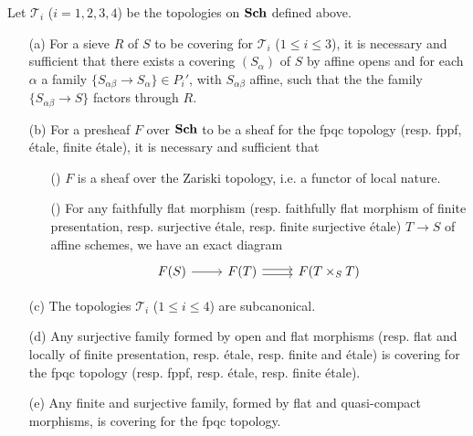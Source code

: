 \begin{proposition}\label{scheme topology on Sch by refining family prop}
Let $\mathcal{T}_i$ ($i=1,2,3,4$) be the topologies on $\mathbf{Sch}$ defined above.
\begin{enumerate}
    \item[(a)] For a sieve $R$ of $S$ to be covering for $\mathcal{T}_i$ ($1\leq i\leq 3$), it is necessary and sufficient that there exists a covering $(S_\alpha)$ of $S$ by affine opens and for each $\alpha$ a family $\{S_{\alpha\beta}\to S_\alpha\}\in P_i'$, with $S_{\alpha\beta}$ affine, such that the the family $\{S_{\alpha\beta}\to S\}$ factors through $R$.
    \item[(b)] For a presheaf $F$ over $\mathbf{Sch}$ to be a sheaf for the fpqc topology (resp. fppf, \'etale, finite \'etale), it is necessary and sufficient that
    \begin{enumerate}
        \item[(\rmnum{1})] $F$ is a sheaf over the Zariski topology, i.e. a functor of local nature.
        \item[(\rmnum{2})] For any faithfully flat morphism (resp. faithfully flat morphism of finite presentation, resp. surjective \'etale, resp. finite surjective \'etale) $T\to S$ of affine schemes, we have an exact diagram
        \[\begin{tikzcd}
        F(S)\ar[r]&F(T)\ar[r,shift left=2pt]\ar[r,shift right=2pt]&F(T\times_ST)
        \end{tikzcd}\]
    \end{enumerate}   
    \item[(c)] The topologies $\mathcal{T}_i$ ($1\leq i\leq 4$) are subcanonical.
    \item[(d)] Any surjective family formed by open and flat morphisms (resp. flat and locally of finite presentation, resp. \'etale, resp. finite and \'etale) is covering for the fpqc topology (resp. fppf, resp. \'etale, resp. finite \'etale).
    \item[(e)] Any finite and surjective family, formed by flat and quasi-compact morphisms, is covering for the fpqc topology. 
\end{enumerate}
\end{proposition}
